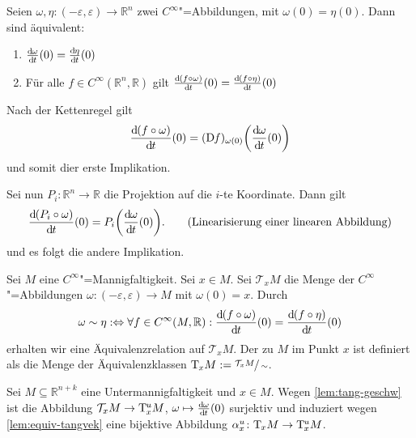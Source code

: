 \begin{lemma}[{name=[Äquivalenz von glatten Wegen]},label=lem:equiv-tangvek]
	Seien $\omega, \eta \colon (-\varepsilon, \varepsilon) \to \mathbb{R}^n$ zwei $C^\infty$"=Abbildungen, mit $\omega(0)= \eta(0)$. Dann sind äquivalent:
	\begin{enumerate}[(1)]
		\item $\frac{\mathrm{d}\mkern-1.0mu \omega}{\mathrm{d}\mkern-1.0mu t} (0)= \frac{\mathrm{d}\mkern-1.0mu \eta}{\mathrm{d}\mkern-1.0mu t} (0)$
		\item Für alle $f \in C^\infty(\mathbb{R}^n,\mathbb{R})$ gilt $\frac{\mathrm{d}\mkern-1.0mu (f \circ \omega)}{\mathrm{d}\mkern-1.0mu t} (0) = \frac{\mathrm{d}\mkern-1.0mu (f \circ \eta)}{\mathrm{d}\mkern-1.0mu t} (0)$
	\end{enumerate}
\end{lemma}
\begin{beweis}
	Nach der Kettenregel gilt
	\[
		\diffd{(f \circ \omega)}{t}(0) = (\D f)_{\omega(0)}\enbrace*{\diffd{\omega}{t}(0)}
	\]
	und somit dier erste Implikation.
	
	Sei nun $P_i : \mathbb{R}^n \to \mathbb{R}$ die Projektion auf die $i$-te Koordinate. 
	Dann gilt
	\begin{align*}
		\diffd{(P_i \circ \omega)}{t}(0) = P_i \enbrace*{\diffd{\omega}{t}(0)}. \tag*{(Linearisierung einer linearen Abbildung)}
	\end{align*}
	und es folgt die andere Implikation.
\end{beweis}

\begin{definition}[{name=[Tangentialraum]}]
	Sei $M$ eine $C^\infty$"=Mannigfaltigkeit. 
	Sei $x \in M$. Sei $\mathcal{T}_x M$ die Menge der $C^\infty$"=Abbildungen $\omega \colon (-\varepsilon,\varepsilon) \to M$ mit $\omega(0)=x$. Durch
	\[
		\omega \sim \eta :\Leftrightarrow \forall f \in C^\infty(M,\mathbb{R}) : \frac{\mathrm{d}\mkern-1.0mu (f \circ \omega)}{\mathrm{d}\mkern-1.0mu t} (0) = \frac{\mathrm{d}\mkern-1.0mu (f \circ \eta)}{\mathrm{d}\mkern-1.0mu t} (0)
	\]
	erhalten wir eine Äquivalenzrelation auf $\mathcal{T}_xM$. 
	Der  zu $M$ im Punkt $x$ ist definiert als die Menge der Äquivalenzklassen  $\mathrm{T}\mkern-0.85mu_x M := \sfrac{\mathcal{T}_x M}{\sim}$.
\end{definition}

\begin{bemerkung}[{name=[Verträglichkeit mit Definition für Untermannigfaltigkeiten]},label=bem:vertraeglich-def-untermfkt]
	Sei $M \subseteq \mathbb{R}^{n+k}$ eine Untermannigfaltigkeit und $x \in M$. 
	Wegen \cref{lem:tang-geschw} ist die Abbildung $\mathcal{T}_x M \to \mathrm{T}\mkern-0.85mu^u_x M$, $\omega \mapsto \frac{\mathrm{d}\mkern-1.0mu \omega}{\mathrm{d}\mkern-1.0mu t} (0)$ surjektiv und induziert wegen \cref{lem:equiv-tangvek} eine bijektive Abbildung $\alpha_x^u \colon \mathrm{T}\mkern-0.85mu_x M \to \mathrm{T}\mkern-0.85mu_x^u M$.
\end{bemerkung}

